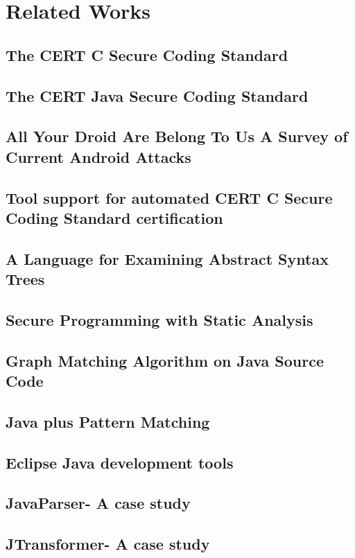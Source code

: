 
\chapter{Related Works}
 
 

\section{The CERT C Secure Coding Standard }
 
\section{The CERT Java Secure Coding Standard}
 
\section{All Your Droid Are Belong To Us A Survey of Current Android Attacks}
 
\section{Tool support for automated CERT C Secure Coding Standard certification}

 
\section{A Language for Examining Abstract Syntax Trees}
 \section{Secure Programming with Static Analysis}
 \section{Graph Matching Algorithm on Java Source Code}
 \section{Java plus Pattern Matching}
 \section{Eclipse Java development tools}
 \section{JavaParser- A case study}
 \section{JTransformer- A case study}

